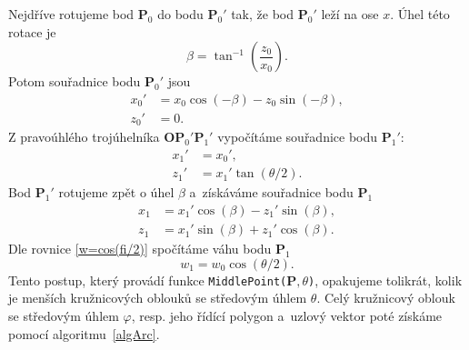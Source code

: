 Nejdříve rotujeme bod $\mathbf{P}_0$ do bodu $\mathbf{P}_0'$ tak, že bod $\mathbf{P}_0'$ leží na ose $x$. Úhel této rotace je 
\begin{equation}
\beta=\tan^{-1}\left(\frac{z_0}{x_0}\right).
\end{equation}
Potom souřadnice bodu $\mathbf{P}_0'$ jsou
\begin{subequations}
	\begin{align}
	x_0'&=x_0\cos\left(-\beta\right)-z_0\sin\left(-\beta\right),\\
	z_0'&=0.
	\end{align}
\end{subequations}
Z pravoúhlého trojúhelníka $\mathbf{O}\mathbf{P}_0'\mathbf{P}_1'$ vypočítáme souřadnice bodu $\mathbf{P}_1'$:
\begin{subequations}
	\begin{align}
	x_1'&=x_0',\\
	z_1'&=x_1'\tan\left(\theta/2\right).
	\end{align}
\end{subequations}
Bod $\mathbf{P}_1'$ rotujeme zpět o úhel $\beta$ a~získáváme souřadnice bodu $\mathbf{P}_1$
\begin{subequations}
	\begin{align}
	x_1&=x_1'\cos\left(\beta\right)-z_1'\sin\left(\beta\right),\\
	z_1&=x_1'\sin\left(\beta\right)+z_1'\cos\left(\beta\right).
	\end{align}
\end{subequations}
Dle rovnice \eqref{w=cos(fi/2)} spočítáme váhu bodu $\mathbf{P}_1$
\begin{equation}
w_1=w_0\cos\left(\theta/2\right).
\end{equation}
Tento postup, který provádí funkce \texttt{MiddlePoint($\mathbf{P},\theta$)}, opakujeme tolikrát, kolik je menších kružnicových oblouků se středovým úhlem $\theta$. Celý kružnicový oblouk se středovým úhlem $\varphi$, resp. jeho řídící polygon a~uzlový vektor poté získáme pomocí algoritmu~\ref{algArc}.
